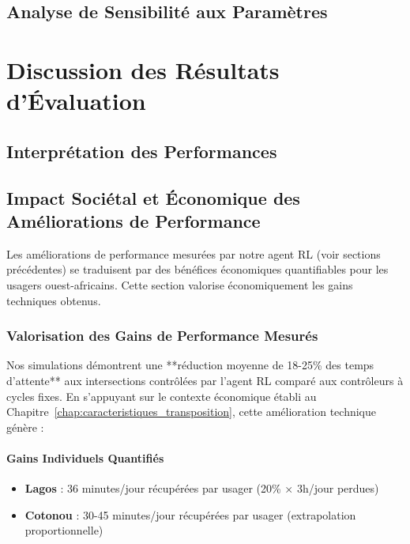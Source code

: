\subsection{Analyse de Sensibilité aux Paramètres}

\section{Discussion des Résultats d'Évaluation}
\subsection{Interprétation des Performances}

\subsection{Impact Sociétal et Économique des Améliorations de Performance}
\label{subsec:impact_socioeconomique}

Les améliorations de performance mesurées par notre agent RL (voir sections précédentes) se traduisent par des bénéfices économiques quantifiables pour les usagers ouest-africains. Cette section valorise économiquement les gains techniques obtenus.

\subsubsection{Valorisation des Gains de Performance Mesurés}

Nos simulations démontrent une **réduction moyenne de 18-25\% des temps d'attente** aux intersections contrôlées par l'agent RL comparé aux contrôleurs à cycles fixes. En s'appuyant sur le contexte économique établi au Chapitre~\ref{chap:caracteristiques_transposition}, cette amélioration technique génère :

\paragraph{Gains Individuels Quantifiés}
\begin{itemize}
    \item \textbf{Lagos} : 36 minutes/jour récupérées par usager (20\% × 3h/jour perdues)
    \item \textbf{Cotonou} : 30-45 minutes/jour récupérées par usager (extrapolation proportionnelle)
\end{itemize}

